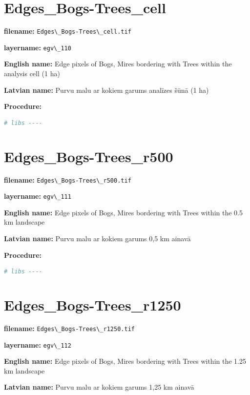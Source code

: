 \documentclass[
]{book}
\newcommand{\passthrough}[1]{#1}
\begin{document}
\section{Edges\_Bogs-Trees\_cell}\label{ch06.110}

\textbf{filename:} \passthrough{\lstinline!Edges\_Bogs-Trees\_cell.tif!}

\textbf{layername:} \passthrough{\lstinline!egv\_110!}

\textbf{English name:} Edge pixels of Bogs, Mires bordering with Trees within the analysis cell (1 ha)

\textbf{Latvian name:} Purvu malu ar kokiem garums analīzes šūnā (1 ha)

\textbf{Procedure:}

\begin{lstlisting}[language=R]
# libs ----
\end{lstlisting}

\section{Edges\_Bogs-Trees\_r500}\label{ch06.111}

\textbf{filename:} \passthrough{\lstinline!Edges\_Bogs-Trees\_r500.tif!}

\textbf{layername:} \passthrough{\lstinline!egv\_111!}

\textbf{English name:} Edge pixels of Bogs, Mires bordering with Trees within the 0.5 km landscape

\textbf{Latvian name:} Purvu malu ar kokiem garums 0,5 km ainavā

\textbf{Procedure:}

\begin{lstlisting}[language=R]
# libs ----
\end{lstlisting}

\section{Edges\_Bogs-Trees\_r1250}\label{ch06.112}

\textbf{filename:} \passthrough{\lstinline!Edges\_Bogs-Trees\_r1250.tif!}

\textbf{layername:} \passthrough{\lstinline!egv\_112!}

\textbf{English name:} Edge pixels of Bogs, Mires bordering with Trees within the 1.25 km landscape

\textbf{Latvian name:} Purvu malu ar kokiem garums 1,25 km ainavā
\end{document}
